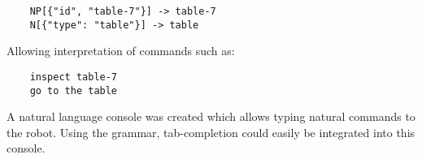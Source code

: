 \begin{lstlisting}
    NP[{"id", "table-7"}] -> table-7
    N[{"type": "table"}] -> table
\end{lstlisting}    
    
Allowing interpretation of commands such as:

\begin{lstlisting}
    inspect table-7
    go to the table
\end{lstlisting}

A natural language console was created which allows typing natural commands to the robot. Using the grammar, tab-completion could easily be integrated into this console.